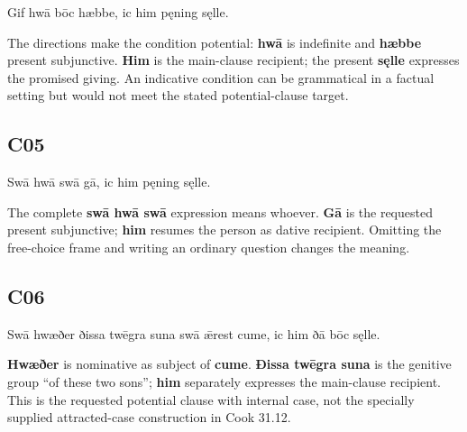 \par\begin{minipage}{\linewidth}\raggedright
Gif hwā bōc hæbbe, ic him pęning sęlle.

The directions make the condition potential: \textbf{hwā} is indefinite and \textbf{hæbbe} present subjunctive. \textbf{Him} is the main-clause recipient; the present \textbf{sęlle} expresses the promised giving. An indicative condition can be grammatical in a factual setting but would not meet the stated potential-clause target.

\end{minipage}\par\addvspace{4pt}

\subsection*{C05}

\par\begin{minipage}{\linewidth}\raggedright
Swā hwā swā gā, ic him pęning sęlle.

The complete \textbf{swā hwā swā} expression means whoever. \textbf{Gā} is the requested present subjunctive; \textbf{him} resumes the person as dative recipient. Omitting the free-choice frame and writing an ordinary question changes the meaning.

\end{minipage}\par\addvspace{4pt}

\subsection*{C06}

\par\begin{minipage}{\linewidth}\raggedright
Swā hwæðer ðissa twēgra suna swā ǣrest cume, ic him ðā bōc sęlle.

\textbf{Hwæðer} is nominative as subject of \textbf{cume}. \textbf{Ðissa twēgra suna} is the genitive group “of these two sons”; \textbf{him} separately expresses the main-clause recipient. This is the requested potential clause with internal case, not the specially supplied attracted-case construction in Cook 31.12.

\end{minipage}\par\addvspace{4pt}

